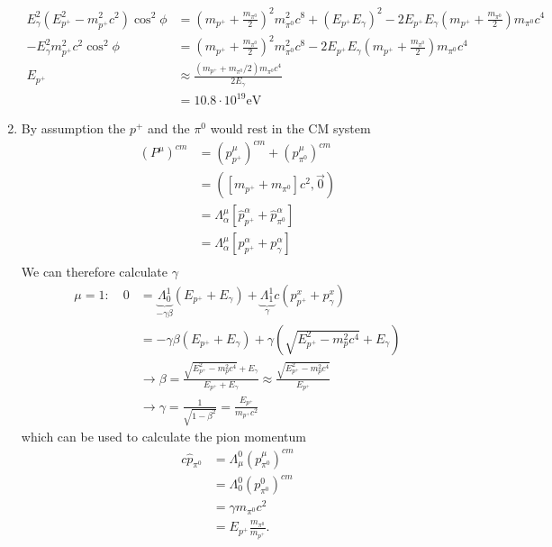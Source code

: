 \documentclass[10pt,a4paper]{book}
\theoremstyle{definition}
\begin{document}
\begin{enumerate}
\begin{align}
        E_\gamma^2\left(E_{p^+}^2-m_{p^+}^2c^2\right)\cos^2{\phi}
        &=\left(m_{p^+}+\frac{m_{\pi^0}}{2}\right)^2m_{\pi^0}^2c^8+(E_{p^+}E_\gamma)^2-2E_{p^+}E_\gamma\left(m_{p^+}+\frac{m_{\pi^0}}{2}\right)m_{\pi^0}c^4\\
        -E_\gamma^2m_{p^+}^2c^2\cos^2{\phi}
        &=\left(m_{p^+}+\frac{m_{\pi^0}}{2}\right)^2m_{\pi^0}^2c^8-2E_{p^+}E_\gamma\left(m_{p^+}+\frac{m_{\pi^0}}{2}\right)m_{\pi^0}c^4\\
        E_{p^+}&\approx\frac{\left(m_{p^+}+m_{\pi^0}/2\right)m_{\pi^0}c^4}{2E_\gamma}\\
        &=10.8\cdot 10^{19}\text{eV}
    \end{align}
    \item By assumption the $p^+$ and the $\pi^0$ would rest in the CM system
    \begin{align}
        (P^\mu)^{cm}&=(p^\mu_{p^+})^{cm}+(p^\mu_{\pi^0})^{cm}\\
                    &=\left([m_{p^+}+m_{\pi^0}]c^2,\vec{0}\right)\\
                    &=\Lambda^\mu_\alpha\left[\hat p^\alpha_{p^+}+\hat p^\alpha_{\pi^0}\right]\\
                    &=\Lambda^\mu_\alpha\left[ p^\alpha_{p^+}+ p^\alpha_{\gamma}\right]\\
    \end{align}
    We can therefore calculate $\gamma$
    \begin{align}
        \mu=1:\quad0&=\underbrace{\Lambda^1_0}_{-\gamma\beta}(E_{p^+}+E_\gamma)+\underbrace{\Lambda^1_1}_{\gamma}c(p^x_{p^+}+p^x_\gamma)\\
        &=-\gamma\beta(E_{p^+}+E_\gamma)+\gamma\left(\sqrt{E_{p^+}^2-m_p^2c^4}+E_\gamma\right)\\
        &\rightarrow\beta=\frac{\sqrt{E_{p^+}^2-m_p^2c^4}+E_\gamma}{E_{p^+}+E_\gamma}\approx\frac{\sqrt{E_{p^+}^2-m_p^2c^4}}{E_{p^+}}\\
        &\rightarrow\gamma=\frac{1}{\sqrt{1-\beta^2}}=\frac{E_{p^+}}{m_{p^+}c^2}
    \end{align}
    which can be used to calculate the pion momentum
    \begin{align}
        c\hat{p}_{\pi^0}&=\Lambda^0_\mu (p_{\pi^0}^\mu)^{cm}\\
        &=\Lambda^0_0 (p_{\pi^0}^0)^{cm}\\
        &=\gamma m_{\pi^0}c^2\\
        &=E_{p^+}\frac{m_{\pi^0}}{m_{p^+}}.
    \end{align}

\end{enumerate}
\end{document}
